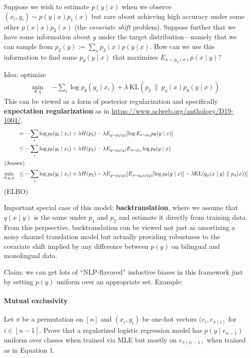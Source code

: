 \documentclass{article}
\newcommand{\KL}[2]{\mathrm{KL}(#1~\|~#2)}
\begin{document}
Suppose we wish to estimate $p(y \mid x)$ when we observe $(x_i, y_i) \sim p(y
\mid x) p_1(x) $ but care about achieving high accuracy under some other $p(x
\mid x) p_2(x)$ (the \emph{covariate shift} problem). Suppose further that we
have some information about $y$ under the target distribution---namely that we
can sample from $p_2(y) := \sum_x p_2(x) p(y \mid x)$. How can we use this
information to find some $p_\theta(y \mid x)$ that maximizes $E_{x \sim p_2(x)} p(x
\mid y)$?

Idea: optimize
\begin{align}
  \min_{\theta,\eta} ~~ &-\sum_i \log p_\theta(y_i \mid x_i) + \lambda~\KL{p_2}{p_\eta(x)
  p_\theta(y \mid x)}
\end{align}
This can be viewed as a form of posterior regularization and specifically
\textbf{expectation regularization} as in
\url{https://www.aclweb.org/anthology/D19-1004/}.
\begin{align}
  &= -\sum_i \log p_\theta(y_i \mid x_i) + \lambda H(p_2) - \lambda E_{y \sim p_2(y)}
  [\log E_{x \sim p_\eta} p_\theta(y \mid x)] \\
  &\leq -\sum_i \log p_\theta(y_i \mid x_i) + \lambda H(p_2) -  \lambda E_{y \sim p_2(y)}
  E_{x \sim p_\eta} \log p_\theta(y \mid x) \\
  \intertext{(Jensen)}
  \min_{\theta, \eta, \phi} ~~ &\leq -\sum_i \log p_\theta(y_i \mid x_i) + \lambda H(p_2) -  \lambda E_{y \sim p_2(y)}[
  E_{x \sim q_\phi(x \mid y)} [\log p_\theta(y \mid x)] -\lambda \KL{q_\phi(x \mid y)}
  {p_\eta(x)}]
\end{align}
(ELBO)

Important special case of this model: \textbf{backtranslation}, where we assume
that $q(x \mid y)$ is the same under $p_1$ and $p_2$ and estimate it directly
from training data. From this perpsective, backtranslation can be viewed not
just as amortizing a noisy channel translation model but actually providing
robustness to the covariate shift implied by any difference between $p(y)$ on
bilingual and monolingual data.

Claim: we can get lots of ``NLP-flavored'' inductive biases in this framework
just by setting $p(y)$ uniform over an appropriate set. Example:

\paragraph{Mutual exclusivity}
Let $\pi$ be a permutation on $[n]$ and $(x_i, y_i)$ be one-hot vectors $(e_i,
e_{\pi(i)}$ for $i \in [n-1]$. Prove that a regularized logistic regression
model has $p(y \mid e_{n-1})$ uniform over classes when trained via MLE but
mostly on $e_{\pi(n-1)}$ when trained as in Equation 1.
\end{document}
